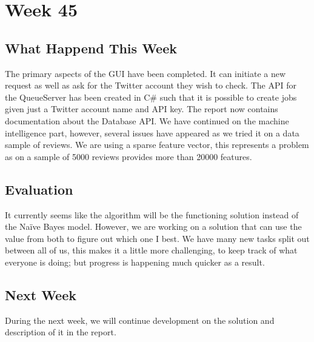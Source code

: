 \section*{Week 45}
\subsection*{What Happend This Week}
The primary aspects of the \ac{GUI} have been completed. It can initiate a new
request as well as ask for the Twitter account they wish to check. The \ac{API}
for the QueueServer has been created in C\# such that it is possible to create
jobs given just a Twitter account name and \ac{API} key. The report now contains
documentation about the Database \ac{API}. We have continued on the machine
intelligence part, however, several issues have appeared as we tried it on a
data sample of reviews. We are using a sparse feature vector, this represents a
problem as on a sample of 5000 reviews provides more than 20000 features.


\subsection*{Evaluation} 
It currently seems like the algorithm will be the functioning solution instead
of the Naïve Bayes model. However, we are working on a solution that can use the
value from both to figure out which one I best. We have many new tasks split out
between all of us, this makes it a little more challenging, to keep track of
what everyone is doing; but progress is happening much quicker as a result.


\subsection*{Next Week}
During the next week, we will continue development on the solution and
description of it in the report.

